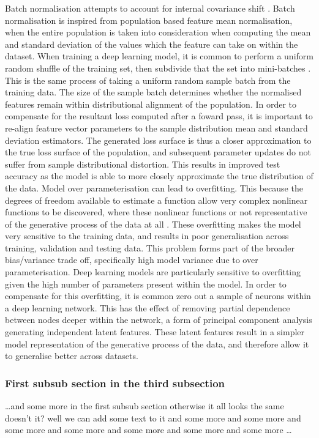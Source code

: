 Batch normalisation attempts to account for internal covariance shift \cite{reference}. Batch normalisation is inspired from population based feature mean normalisation, when the entire population is taken into consideration when computing the mean and standard deviation of the values which the feature can take on within the dataset. When training a deep learning model, it is common to perform a uniform random shuffle of the training set, then subdivide that the set into mini-batches \cite{reference}. This is the same process of taking a uniform random sample batch from the training data. The size of the sample batch determines whether the normalised features remain within distributional alignment of the population. In order to compensate for the resultant loss computed after a foward pass, it is important to re-align feature vector parameters to the sample distribution mean and standard deviation estimators. The generated loss surface is thus a closer approximation to the true loss surface of the population, and subsequent parameter updates do not suffer from sample distributional distortion. This results in improved test accuracy as the model is able to more closely approximate the true distribution of the data. \newline Model over parameterisation can lead to overfitting. This because the degrees of freedom available to estimate a function allow very complex nonlinear functions to be discovered, where these nonlinear functions or not representative of the generative process of the data at all \cite{reference}. These overfitting makes the model very sensitive to the training data, and results in poor generalisation across training, validation and testing data. This problem forms part of the broader bias/variance trade off, specifically high model variance due to over parameterisation. Deep learning models are particularly sensitive to overfitting given the high number of parameters present within the model. In order to compensate for this overfitting, it is common zero out a sample of neurons within a deep learning network. This has the effect of removing partial dependence between nodes deeper within the network, a form of principal component analysis generating independent latent features. These latent features result in a simpler model representation of the generative process of the data, and therefore allow it to generalise better across datasets. 

\subsubsection{First subsub section in the third subsection}
\dots and some more in the first subsub section otherwise it all looks the same
doesn't it? well we can add some text to it and some more and some more and
some more and some more and some more and some more and some more \dots

